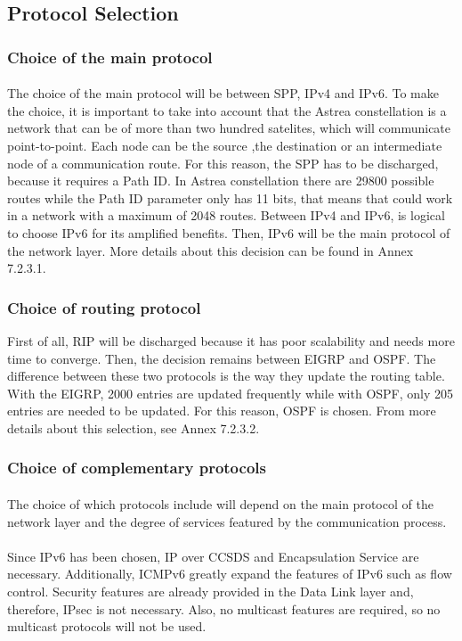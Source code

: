 \subsection{Protocol Selection}
\subsubsection{Choice of the main protocol}
\paragraph{}The choice of the main protocol will be between SPP, IPv4 and IPv6. To make the choice, it is important to take into account that the Astrea constellation is a network that can be of more than two hundred satelites, which will communicate point-to-point. Each node can be the source ,the destination or an intermediate node of a communication route.
For this reason, the SPP has to be discharged, because it requires a Path ID. In Astrea constellation there are 29800 possible routes while the Path ID parameter only has 11 bits, that means that could work in a network with a maximum of 2048 routes. Between IPv4 and IPv6, is logical to choose IPv6 for its amplified benefits. Then, IPv6 will be the main protocol of the network layer. More details about this decision can be found in Annex 7.2.3.1. 
\subsubsection{Choice of routing protocol}
First of all, RIP will be discharged because it has poor scalability and needs more time to converge. Then, the decision remains between EIGRP and OSPF. The difference between these two protocols is the way they update the routing table. With the EIGRP, 2000 entries are updated frequently while with OSPF, only 205 entries are needed to be updated. For this reason, OSPF is chosen. From more details about this selection, see Annex 7.2.3.2.
\subsubsection{Choice of complementary protocols}
\paragraph{}The choice of which protocols include will depend on the main protocol of the network layer and the degree of services featured by the communication process.
\paragraph{}Since IPv6 has been chosen, IP over CCSDS and Encapsulation Service are necessary. Additionally, ICMPv6 greatly expand the features of IPv6 such as flow control. Security features are already provided in the Data Link layer and, therefore, IPsec is not necessary. Also, no multicast features are required, so no multicast protocols will not be used.

